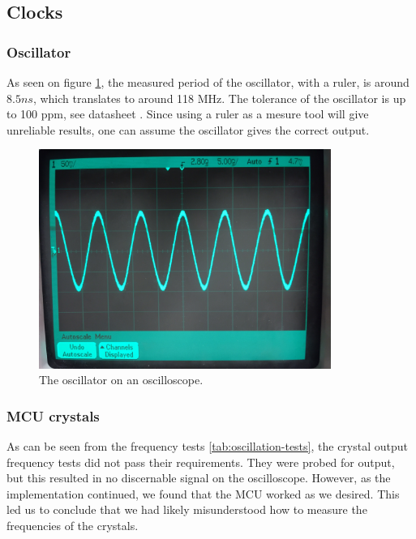 \documentclass[../main/report.tex]{subfiles}
\begin{document}
\subsection{Clocks}

\subsubsection*{Oscillator}

As seen on figure \ref{fig:oscillator-scope}, the measured period of the oscillator, with a ruler, is around $8.5 ns$, which translates to around 118 MHz.
The tolerance of the oscillator is up to 100 ppm, see datasheet \cite{xpresso-oscillator}.
Since using a ruler as a mesure tool will give unreliable results, one can assume the oscillator gives the correct output.
\begin{figure}[H]
		\centering
		\includegraphics[width=0.85\textwidth]{../discussion/assets/oscillator.jpg}
		\caption{The oscillator on an oscilloscope.}
		\label{fig:oscillator-scope}
\end{figure}

\subsubsection*{MCU crystals}
As can be seen from the frequency tests \ref{tab:oscillation-tests}, the crystal output frequency tests did not pass their requirements.
They were probed for output, but this resulted in no discernable signal on the oscilloscope.
However, as the implementation continued, we found that the MCU worked as we desired.
This led us to conclude that we had likely misunderstood how to measure the frequencies of the crystals.


\end{document}
